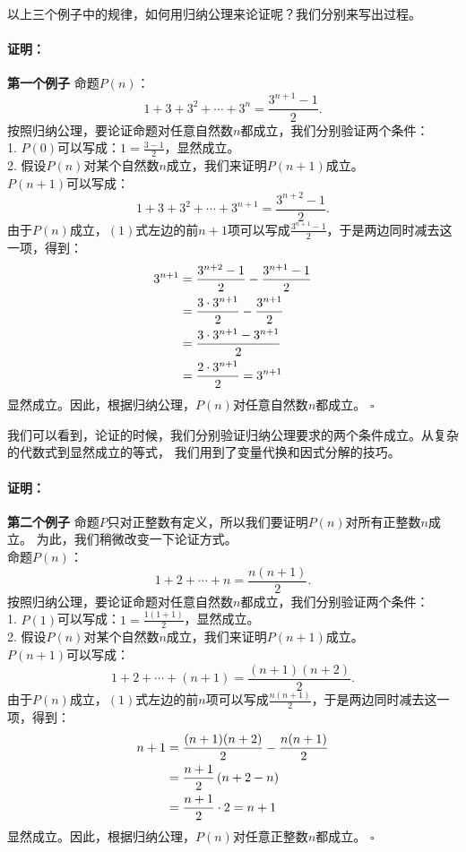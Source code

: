 \documentclass[12pt,UTF8]{ctexbook}
\newenvironment{proof2}{\paragraph{\textbf{证明：}}}{\hfill$\square$}
\begin{document}
以上三个例子中的规律，如何用归纳公理来论证呢？我们分别来写出过程。
\begin{proof2}{\textbf{第一个例子 }}
    命题$P(n)$：
    $$ 1 + 3 + 3^2 + \cdots + 3^n = \frac{3^{n+1} - 1}{2}. $$
    按照归纳公理，要论证命题对任意自然数$n$都成立，我们分别验证两个条件：\\
    1. $P(0)$可以写成：$1 = \frac{3 - 1}{2}$，显然成立。\\
    2. 假设$P(n)$对某个自然数$n$成立，我们来证明$P(n+1)$成立。\\
    $P(n+1)$可以写成：
    $$ 1 + 3 + 3^2 + \cdots + 3^{n+1} = \frac{3^{n+2} - 1}{2}. $$
    由于$P(n)$成立，$(1)$式左边的前$n+1$项可以写成$\frac{3^{n+1} - 1}{2}$，于是两边同时减去这一项，得到：
    \begin{align}
        3^{n+1} &= \frac{3^{n+2} - 1}{2} - \frac{3^{n+1} - 1}{2} \notag \\
        &= \frac{3\cdot 3^{n+1}}{2} - \frac{3^{n+1}}{2} \notag \\
        &= \frac{3\cdot 3^{n+1} - 3^{n+1}}{2} \notag \\
        &= \frac{2 \cdot 3^{n+1}}{2} = 3^{n+1} \notag
    \end{align}
    显然成立。因此，根据归纳公理，$P(n)$对任意自然数$n$都成立。    
\end{proof2}

我们可以看到，论证的时候，我们分别验证归纳公理要求的两个条件成立。从复杂的代数式到显然成立的等式，
我们用到了变量代换和因式分解的技巧。

\begin{proof2}{\textbf{第二个例子 }}
    命题$P$只对正整数有定义，所以我们要证明$P(n)$对所有正整数$n$成立。
    为此，我们稍微改变一下论证方式。\\
    命题$P(n)$：
    $$ 1 + 2 + \cdots + n = \frac{n(n+1)}{2}. $$
    按照归纳公理，要论证命题对任意自然数$n$都成立，我们分别验证两个条件：\\
    1. $P(1)$可以写成：$1 = \frac{1(1+1)}{2}$，显然成立。\\
    2. 假设$P(n)$对某个自然数$n$成立，我们来证明$P(n+1)$成立。\\
    $P(n+1)$可以写成：
    $$ 1 + 2 + \cdots + (n+1) = \frac{(n+1)(n+2)}{2}.  $$
    由于$P(n)$成立，$(1)$式左边的前$n$项可以写成$\frac{n(n+1)}{2}$，于是两边同时减去这一项，得到：
    \begin{align}
        n+1 &= \frac{(n+1)(n+2)}{2} - \frac{n(n+1)}{2} \notag \\
        &= \frac{n+1}{2}\left(n+2 - n\right) \notag \\
        &= \frac{n+1}{2} \cdot 2 = n+1 \notag
    \end{align}
    显然成立。因此，根据归纳公理，$P(n)$对任意正整数$n$都成立。    
\end{proof2}
\end{document}
